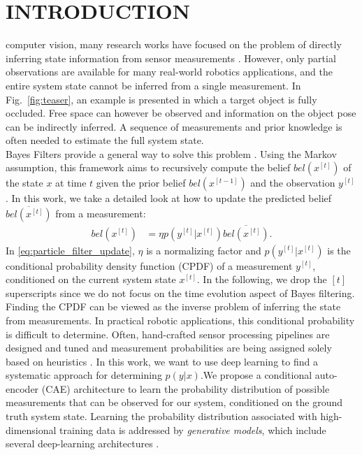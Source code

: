 \documentclass[letterpaper, 10 pt, journal, twoside]{ieeetran}  %
\begin{document}
\section{INTRODUCTION}
 computer vision, many research works have focused on the problem of directly inferring state information from sensor measurements \cite{redmonYouOnlyLook2016, heMaskRCNN2018, xiang2017posecnn}.
However, only partial observations are available for many real-world robotics applications, and the entire system state cannot be inferred from a single measurement.
In Fig.~\ref{fig:teaser}, an example is presented in which a target object is fully occluded. Free space can however be observed and information on the object pose can be indirectly inferred.
A sequence of measurements and prior knowledge is often needed to estimate the full system state.
\\
Bayes Filters provide a general way to solve this problem \cite{thrun2005probabilistic}. Using the Markov assumption, this framework aims to recursively compute the belief $bel(x^{[t]})$ of the state $x$ at time $t$ given the prior belief $bel(x^{[t-1]})$ and the observation $y^{[t]}$.
In this work, we take a detailed look at how to update the predicted belief $\overline{bel(x^{[t]})}$ from a measurement:
\begin{align}
bel(x^{[t]}) &= \eta p(y^{[t]}|x^{[t]}) \overline{bel(x^{[t]})}.
\label{eq:particle_filter_update}
\end{align}
In \eqref{eq:particle_filter_update}, $\eta$ is a normalizing factor and $p(y^{[t]}|x^{[t]})$ is the conditional probability density function (CPDF) of a measurement $y^{[t]}$, conditioned on the current system state $x^{[t]}$.
In the following, we drop the $[t]$ superscripts since we do not focus on the time evolution aspect of Bayes filtering.\\
Finding the CPDF can be viewed as the inverse problem of inferring the state from measurements. In practical robotic applications, this conditional probability is difficult to determine.
Often, hand-crafted sensor processing pipelines are designed and tuned and measurement probabilities are being assigned solely based on heuristics \cite{thrun2005probabilistic, montemerloFastSLAMScalableMethod2007}.
In this work, we want to use deep learning to find a systematic approach for determining $p(y|x)$.We propose a conditional auto-encoder (CAE) architecture to learn the probability distribution of possible measurements that can be observed for our system, conditioned on the ground truth system state. Learning the probability distribution associated with high-dimensional training data is addressed by \textit{generative models}, which include several deep-learning architectures \cite{salakhutdinov2009deep, hinton2006fast, goodfellow2014generative, kingma2013auto, sohn2015learning, rezende2014stochastic}.
\end{document}
